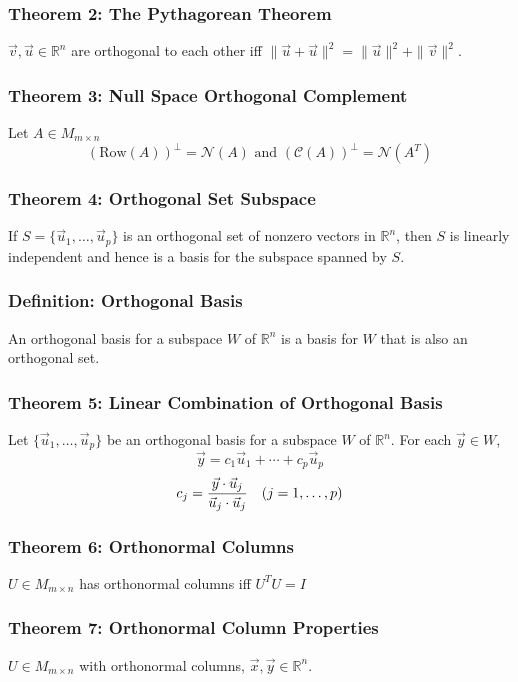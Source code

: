 \documentclass{article}
\begin{document}
\subsubsection*{Theorem 2: The Pythagorean Theorem}
$\vec v , \vec u \in \mathbb R^n$ are orthogonal to each other iff $\| \vec u + \vec u\|^2 = \|\vec u\|^2 + \|\vec v\|^2$.

\subsubsection*{Theorem 3: Null Space Orthogonal Complement}
Let $A \in M_{m \times n}$ 
$$(\text{Row}(A))^\perp = \mathcal N (A) \text{  and  } (\mathcal C (A) )^\perp = \mathcal N (A^T)$$

\subsubsection*{Theorem 4: Orthogonal Set Subspace}
If $S = \{ \vec u_1 , \dots, \vec u_p \}$ is an orthogonal set of nonzero vectors in $\mathbb R^n$, then $S$ is linearly independent and hence is a basis for the subspace spanned by $S$. 

\subsubsection*{Definition: Orthogonal Basis}
An orthogonal basis for a subspace $W$ of $\mathbb R^n$ is a basis for $W$ that is also an orthogonal set. 

\subsubsection*{Theorem 5: Linear Combination of Orthogonal Basis}
Let $\{ \vec u_1 , \dots , \vec u_p \}$ be an orthogonal basis for a subspace $W$ of $\mathbb R^n$. For each $\vec y \in W$, 
$$\vec y = c_1 \vec u_1 + \cdots + c_p \vec u_p$$
$$c_j = \frac{\vec y \cdot \vec u_j}{\vec u_j \cdot \vec u_j} \hspace{10 pt} (j = 1, \dots , p)$$

\subsubsection*{Theorem 6: Orthonormal Columns}
$U \in M_{m \times n}$ has orthonormal columns iff $U^T U = I$

\subsubsection*{Theorem 7: Orthonormal Column Properties}
$U \in M_{m \times n}$ with orthonormal columns, $\vec x , \vec y \in \mathbb R^n$. 
\end{document}
